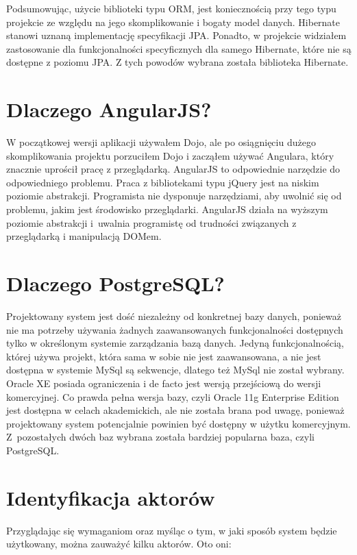 \documentclass[a4paper,onecolumn,oneside,11pt,wide,floatssmall]{mwrep}
\theoremstyle{definition}
\theoremstyle{plain}%
\theoremstyle{remark}
\begin{document}
Podsumowując, użycie biblioteki typu ORM, jest koniecznością przy tego typu projekcie ze względu na jego skomplikowanie i bogaty model danych. Hibernate stanowi uznaną implementację specyfikacji JPA. Ponadto, w projekcie widziałem zastosowanie dla funkcjonalności specyficznych dla samego Hibernate, które nie są dostępne z poziomu JPA. Z tych powodów wybrana została biblioteka Hibernate.

\section{Dlaczego AngularJS?}
 W początkowej wersji aplikacji używałem Dojo, ale po osiągnięciu dużego skomplikowania projektu porzuciłem Dojo i zacząłem używać Angulara, który znacznie uprościł pracę z przeglądarką. AngularJS to odpowiednie narzędzie do odpowiedniego problemu. Praca z bibliotekami typu jQuery jest na niskim poziomie abstrakcji. Programista nie dysponuje narzędziami, aby uwolnić się od problemu, jakim jest środowisko przeglądarki. AngularJS działa na wyższym poziomie abstrakcji \mbox{i uwalnia} programistę od trudności związanych z przeglądarką i manipulacją \mbox{DOMem}.


\section{Dlaczego PostgreSQL?}
Projektowany system jest dość niezależny od konkretnej bazy danych, ponieważ nie ma potrzeby używania żadnych zaawansowanych funkcjonalności dostępnych tylko w określonym systemie zarządzania bazą danych. Jedyną funkcjonalnością, której używa projekt, która sama w sobie nie jest zaawansowana, a nie jest dostępna w systemie MySql są sekwencje, dlatego też MySql nie został wybrany. Oracle XE posiada ograniczenia i de facto jest wersją przejściową do wersji komercyjnej. Co prawda pełna wersja bazy, czyli Oracle 11g Enterprise Edition jest dostępna w celach akademickich, ale nie została brana pod uwagę, ponieważ projektowany system potencjalnie powinien być dostępny w użytku komercyjnym. \mbox{Z pozostałych} dwóch baz wybrana została bardziej popularna baza, czyli PostgreSQL.


\section{Identyfikacja aktorów}
Przyglądając się wymaganiom oraz myśląc o tym, w jaki sposób system będzie użytkowany, można zauważyć kilku aktorów. Oto oni:
\end{document}
